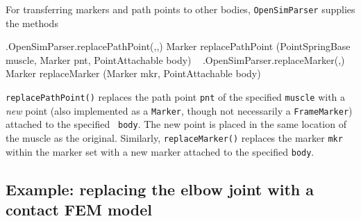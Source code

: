 For transferring markers and path points to other bodies, {\tt OpenSimParser}
supplies the methods
%
\begin{methodtable}{0.9}{0.1}
\midline
%
\methodentry
{\osim.OpenSimParser.replacePathPoint(,,)}%
{Marker replacePathPoint (PointSpringBase muscle, Marker pnt,
PointAttachable body)}%
{\ }%
%
\methodspace{0.5em}
\methodentry
{\osim.OpenSimParser.replaceMarker(,)}%
{Marker replaceMarker (Marker mkr, PointAttachable body)}%
{\ }%
%
\midline
\end{methodtable}
%
{\tt replacePathPoint()} replaces the path point {\tt pnt} of the specified
{\tt muscle} with a {\it new} point (also implemented as a {\tt Marker},
though not necessarily a {\tt FrameMarker}) attached to the specified {\tt
body}. The new point is placed in the same location of the muscle as the
original. Similarly, {\tt replaceMarker()} replaces the marker {\tt mkr} within
the marker set with a new marker attached to the specified {\tt body}.

\subsection{Example: replacing the elbow joint with a contact FEM model}
\label{OpenSimFemElbow:sec}

